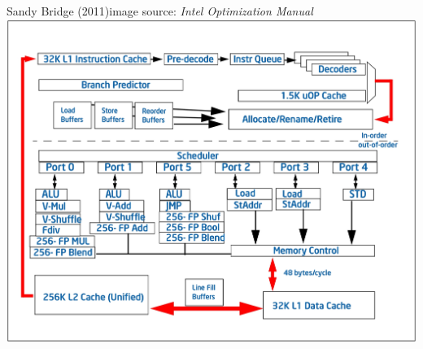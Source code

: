 \documentclass[mathserif,xcolor={dvipsnames,table}]{beamer}
\begin{document}
\begin{frame}{Sandy Bridge (2011)\hfill\tiny{image source: \textit{Intel Optimization Manual}}}
\includegraphics[scale=.175]{images/sandybridge.jpg}
\end{frame}
\end{document}
